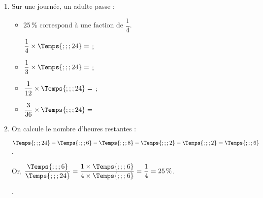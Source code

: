 \begin{Maquette}[Fiche,CorrigeFin,Colonnes=2]{}
\begin{multicols}{2}
      \begin{Solution}
         \begin{enumerate}
            \item Sur une journée, un adulte passe : \smallskip
            \begin{itemize}
               \item 25\,\% correspond à une faction de $\dfrac14$. \par
                  \quad $\dfrac14\times\Temps{;;;24} =$  ; \par
               \item $\dfrac13\times\Temps{;;;24} =$  ; \par
               \item $\dfrac1{12}\times\Temps{;;;24} =$  ; \par
               \item $\dfrac{3}{36}\times\Temps{;;;24} =$ 
            \end{itemize}
            \item On calcule le nombre d'heures restantes : \par
               $\Temps{;;;24}-\Temps{;;;6}-\Temps{;;;8}-\Temps{;;;2}-\Temps{;;;2} =\Temps{;;;6}$. \par
               Or, $\dfrac{\Temps{;;;6}}{\Temps{;;;24}} =\dfrac{1\times\Temps{;;;6}}{4\times\Temps{;;;6}} =\dfrac14 =25\,\%$. \par
               .
         \end{enumerate} 
      \end{Solution}
      


\end{multicols}
\end{Maquette}
